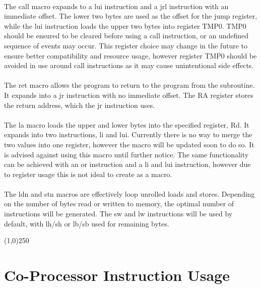 \documentclass[letterpaper, 11pt]{article}
\begin{document}
\paragraph{} The call macro expands to a lui instruction and a jrl instruction with an immediate offset. The lower two bytes
are used as the offset for the jump register, while the lui instruction loads the upper two bytes into register TMP0. 
TMP0 should be ensured to be cleared before using a call instruction, or an undefined sequence of events may occur.
This register choice may change in the future to ensure better compatibility and resource usage, however register TMP0 should
be avoided in use around call instructions as it may cause unintentional side effects. 

\paragraph{} The ret macro allows the program to return to the program from the subroutine. It expands into a jr instruction
with no immediate offset. The RA register stores the return address, which the jr instruction uses. 

\paragraph{} The la macro loads the upper and lower bytes into the specified register, Rd. It expands into two instructions,
li and lui. Currently there is no way to merge the two values into one register, however the macro will be updated soon to do so.
It is advised against using this macro until further notice. The same functionality can be achieved with an or instruction and
a li and lui instruction, however due to register usage this is not ideal to create as a macro.

\paragraph{} The ldn and stn macros are effectively loop unrolled loads and stores. Depending on the number of bytes read or written to memory,
the optimal number of instructions will be generated. The sw and lw instructions will be used by default, with lh/sh or lb/sb used for remaining bytes.

\begin{center}
	\line(1,0){250}
\end{center}

\clearpage
\section{Co-Processor Instruction Usage}
\end{document}
